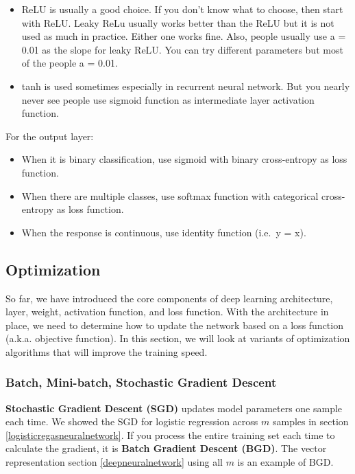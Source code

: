 \documentclass[
  12pt,
]{krantz}
\providecommand{\tightlist}{%
  \setlength{\itemsep}{0pt}\setlength{\parskip}{0pt}}
\begin{document}
\begin{itemize}
\tightlist
\item
  ReLU is usually a good choice. If you don't know what to choose, then start with ReLU. Leaky ReLu usually works better than the ReLU but it is not used as much in practice. Either one works fine. Also, people usually use a = 0.01 as the slope for leaky ReLU. You can try different parameters but most of the people a = 0.01.
\item
  tanh is used sometimes especially in recurrent neural network. But you nearly never see people use sigmoid function as intermediate layer activation function.
\end{itemize}

For the output layer:

\begin{itemize}
\tightlist
\item
  When it is binary classification, use sigmoid with binary cross-entropy as loss function.
\item
  When there are multiple classes, use softmax function with categorical cross-entropy as loss function.
\item
  When the response is continuous, use identity function (i.e.~y = x).
\end{itemize}

\hypertarget{optimization}{%
\subsection{Optimization}\label{optimization}}

So far, we have introduced the core components of deep learning architecture, layer, weight, activation function, and loss function. With the architecture in place, we need to determine how to update the network based on a loss function (a.k.a. objective function). In this section, we will look at variants of optimization algorithms that will improve the training speed.

\hypertarget{batch-mini-batch-stochastic-gradient-descent}{%
\subsubsection{Batch, Mini-batch, Stochastic Gradient Descent}\label{batch-mini-batch-stochastic-gradient-descent}}

\textbf{Stochastic Gradient Descent (SGD)} updates model parameters one sample each time. We showed the SGD for logistic regression across \(m\) samples in section \ref{logisticregasneuralnetwork}. If you process the entire training set each time to calculate the gradient, it is \textbf{Batch Gradient Descent (BGD)}. The vector representation section \ref{deepneuralnetwork} using all \(m\) is an example of BGD.
\end{document}

